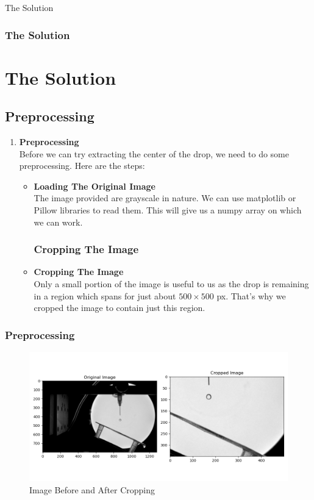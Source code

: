 \documentclass{beamer}
\begin{document}
\begin{frame}{The Solution}
    \frametitle{The Solution}
    \section[]{The Solution}
    \subsection{Preprocessing}
    \begin{enumerate}
        \item <1-> \textbf{Preprocessing}\\
              Before we can try extracting the center of the drop, we need to do some preprocessing. Here are the steps:
              \begin{itemize}
                  \subsubsection[]{Loading Image}
                  \item <2-> \textbf{Loading The Original Image}\\ The image provided are grayscale in nature. We can use matplotlib or Pillow libraries to read them. This will give us a numpy array on which we can work.\subsubsection[]{Cropping The Image}
                  \item <3->\textbf{Cropping The Image}\\Only a small portion of the image is useful to us as the drop is remaining in a region which spans for just about \(500\times 500\) px. That's why we cropped the image to contain just this region.
              \end{itemize}
    \end{enumerate}
\end{frame}
\begin{frame}
    \frametitle{Preprocessing}
    \begin{figure}
        \centering
        \includegraphics[scale=0.45]{cropped.png}
        \caption[]{Image Before and After Cropping}
    \end{figure}
\end{frame}
\end{document}
